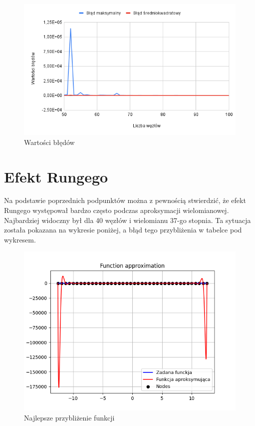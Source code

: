 \documentclass{article}
\begin{document}
\begin{figure}[H]
  \centering
  \begin{minipage}[b]{0.4\textwidth}
    \includegraphics[width=\textwidth]{img47.png}
    \caption{Wartości błędów}
  \end{minipage}
\end{figure}

\newpage

\section{Efekt Rungego}

Na podstawie poprzednich podpunktów można z pewnością stwierdzić, że efekt Rungego występował bardzo często podczas aproksymacji wielomianowej. Najbardziej widoczny był dla 40 węzłów i wielomianu 37-go stopnia. Ta sytuacja została pokazana na wykresie poniżej, a błąd tego przybliżenia w tabelce pod wykresem.

\begin{figure}[H]
  \centering
  \begin{minipage}[b]{0.4\textwidth}
    \includegraphics[width=\textwidth]{img49.png}
    \caption{Najlepsze przybliżenie funkcji}
  \end{minipage}
\end{figure}
\end{document}
